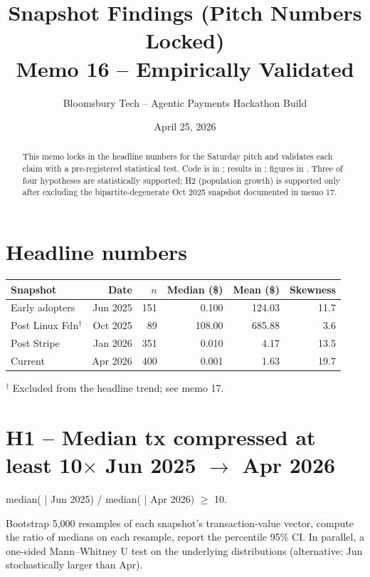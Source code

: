 \documentclass[11pt]{article}
\title{\textbf{Snapshot Findings (Pitch Numbers Locked)}\\
\large Memo 16 -- Empirically Validated}
\author{Bloomsbury Tech -- Agentic Payments Hackathon Build}
\date{April 25, 2026}
\begin{document}
\maketitle

\begin{abstract}
This memo locks in the headline numbers for the Saturday pitch and validates
each claim with a pre-registered statistical test. Code is in
; results in
; figures in
. Three of four hypotheses are statistically supported;
H2 (population growth) is supported only after excluding the bipartite-degenerate
Oct 2025 snapshot documented in memo 17.
\end{abstract}

\section{Headline numbers}

\begin{center}
\begin{tabular}{lrrrrr}
\toprule
Snapshot & Date & $n$ & Median (\$) & Mean (\$) & Skewness \\
\midrule
Early adopters    & Jun 2025 & 151 & 0.100 & 124.03 & 11.7 \\
Post Linux Fdn$^\dagger$ & Oct 2025 & 89  & 108.00 & 685.88 & 3.6 \\
Post Stripe       & Jan 2026 & 351 & 0.010 & 4.17  & 13.5 \\
Current           & Apr 2026 & 400 & 0.001 & 1.63  & 19.7 \\
\bottomrule
\end{tabular}
\end{center}
\noindent$^\dagger$ Excluded from the headline trend; see memo 17.

\section{H1 -- Median tx compressed at least 10$\times$ Jun 2025 $\to$ Apr 2026}

\begin{hypothesis}
median( | Jun 2025) / median( | Apr 2026) $\geq$ 10.
\end{hypothesis}

\begin{experiment}
Bootstrap 5{,}000 resamples of each snapshot's transaction-value vector, compute
the ratio of medians on each resample, report the percentile 95\% CI. In
parallel, a one-sided Mann--Whitney U test on the underlying distributions
(alternative: Jun stochastically larger than Apr).
\end{experiment}
\end{document}
